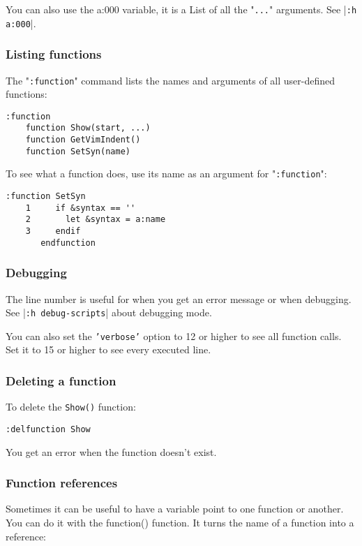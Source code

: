 You can also use the a:000 variable, it is a List of all the "\texttt{...}" arguments.
See |\texttt{:h a:000}|.

\subsubsection{Listing functions}
The "\texttt{:function}" command lists the names and arguments of all user-defined
functions:

\begin{Verbatim}[samepage=true]
 :function
    function Show(start, ...)
    function GetVimIndent()
    function SetSyn(name)
\end{Verbatim}

To see what a function does, use its name as an argument for "\texttt{:function}":

\begin{Verbatim}[samepage=true]
 :function SetSyn
    1     if &syntax == ''
    2       let &syntax = a:name
    3     endif
       endfunction
\end{Verbatim}

\subsubsection{Debugging}
The line number is useful for when you get an error message or when debugging.
See |\texttt{:h debug-scripts}| about debugging mode.

You can also set the \texttt{'verbose'} option to 12 or higher to see all function calls.
Set it to 15 or higher to see every executed line.

\subsubsection{Deleting a function}
To delete the \texttt{Show()} function:

\begin{Verbatim}[samepage=true]
 :delfunction Show
\end{Verbatim}

You get an error when the function doesn't exist.

\subsubsection{Function references}
Sometimes it can be useful to have a variable point to one function or another.
You can do it with the function() function.
It turns the name of a function into a reference:

